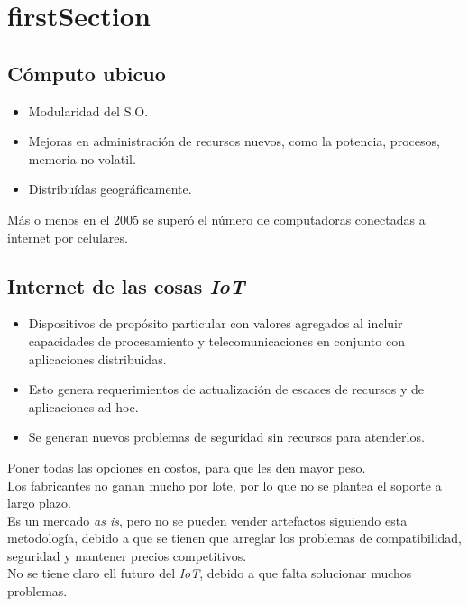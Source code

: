 \newpage
\part{\acrlong{firstSection}}

\chapter{C\'{o}mputo ubicuo}

\begin{itemize}
	\item Modularidad del S.O.
	\item Mejoras en administraci\'{o}n de recursos nuevos, como la potencia, procesos, memoria no volatil.
	\item Distribu\'{i}das geogr\'{a}ficamente.
\end{itemize}
M\'{a}s o menos en el 2005 se super\'{o} el n\'{u}mero de computadoras conectadas a internet por celulares.

\chapter{Internet de las cosas \textit{IoT}}

\begin{itemize}
	\item Dispositivos de prop\'{o}sito particular con valores agregados al incluir capacidades de procesamiento y telecomunicaciones en conjunto con aplicaciones distribuidas.
	\item Esto genera requerimientos de actualizaci\'{o}n de escaces de recursos y de aplicaciones ad-hoc.
	\item Se generan nuevos problemas de seguridad sin recursos para atenderlos.
\end{itemize}
Poner todas las opciones en costos, para que les den mayor peso.\\
Los fabricantes no ganan mucho por lote, por lo que no se plantea el soporte a largo plazo.\\
Es un mercado \textit{as is}, pero no se pueden vender artefactos siguiendo esta metodolog\'{i}a, debido a que se tienen que arreglar los problemas de compatibilidad, seguridad y mantener precios competitivos.\\
No se tiene claro ell futuro del \textit{IoT}, debido a que falta solucionar muchos problemas.

